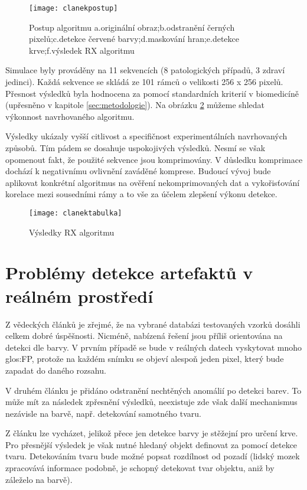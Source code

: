 \begin{figure}[h]
	\texttt{[image: clanekpostup]}
	\centering
	\caption{Postup algoritmu a.originální obraz;b.odstranění černých pixelů;c.detekce červené barvy;d.maskování hran;e.detekce krve;f.výsledek RX algoritmu \cite{technique} \label{fig:clanepostup}}
\end{figure} 
\FloatBarrier
	
Simulace byly prováděny na 11 sekvencích (8 patologických případů, 3 zdraví jedinci). Každá sekvence se skládá ze 101 rámců o velikosti 256 x 256 pixelů. Přesnost výsledků byla hodnocena za pomocí standardních kriterií v biomedicíně (upřesněno v kapitole \ref{sec:metodologie}). Na obrázku \ref{fig:clanektabulka} můžeme shledat výkonnost navrhovaného algoritmu.

Výsledky ukázaly vyšší citlivost a specifičnost experimentálních navrhovaných způsobů. Tím pádem se dosahuje uspokojivých výsledků. Nesmí se však opomenout fakt, že použité sekvence jsou komprimovány. V důsledku komprimace dochází k negativnímu ovlivnění zaváděné komprese. Budoucí vývoj bude aplikovat konkrétní algoritmus na ověření nekomprimovaných dat a vykořisťování korelace mezi sousedními rámy a to vše za účelem zlepšení výkonu detekce.

\begin{figure}[h]
	\texttt{[image: clanektabulka]}
	\centering
	\caption{Výsledky RX algoritmu \cite{technique} \label{fig:clanektabulka}}
\end{figure} 
\FloatBarrier

\section{Problémy detekce artefaktů v reálném prostředí}
Z vědeckých článků je zřejmé, že na vybrané databázi testovaných vzorků dosáhli celkem dobré úspěšnosti. Nicméně, nabízená řešení jsou příliš orientována na detekci dle barvy. V prvním případě se bude v reálných datech vyskytovat mnoho \gls{glos:FP}, protože na každém snímku se objeví alespoň jeden pixel, který bude zapadat do daného rozsahu.

V druhém článku je přidáno odstranění nechtěných anomálií po detekci barev. To může mít za následek zpřesnění výsledků, neexistuje zde však další mechanismus nezávisle na barvě, např. detekování samotného tvaru.

Z článku lze vycházet, jelikož přece jen detekce barvy je stěžejní pro určení krve. Pro přesnější výsledek je však nutné hledaný objekt definovat za pomocí detekce tvaru. Detekováním tvaru bude možné popsat rozdílnost od pozadí (lidský mozek zpracovává informace podobně, je schopný detekovat tvar objektu, aniž by záleželo na barvě).
